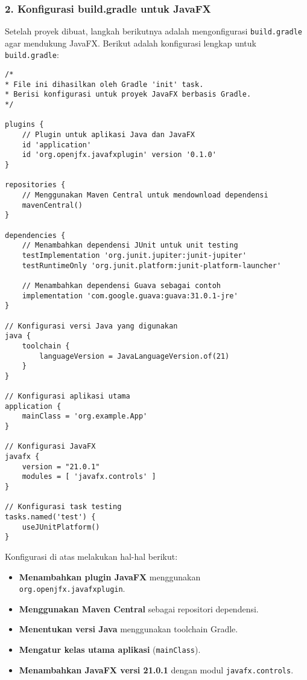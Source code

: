 \subsubsection{2. Konfigurasi build.gradle untuk JavaFX}

Setelah proyek dibuat, langkah berikutnya adalah mengonfigurasi \texttt{build.gradle} agar mendukung JavaFX. Berikut adalah konfigurasi lengkap untuk \texttt{build.gradle}:

\begin{lstlisting}[style=JavaStyle, caption=Konfigurasi build.gradle untuk JavaFX]
/*
* File ini dihasilkan oleh Gradle 'init' task.
* Berisi konfigurasi untuk proyek JavaFX berbasis Gradle.
*/

plugins {
	// Plugin untuk aplikasi Java dan JavaFX
	id 'application'
	id 'org.openjfx.javafxplugin' version '0.1.0'
}

repositories {
	// Menggunakan Maven Central untuk mendownload dependensi
	mavenCentral()
}

dependencies {
	// Menambahkan dependensi JUnit untuk unit testing
	testImplementation 'org.junit.jupiter:junit-jupiter'
	testRuntimeOnly 'org.junit.platform:junit-platform-launcher'
	
	// Menambahkan dependensi Guava sebagai contoh
	implementation 'com.google.guava:guava:31.0.1-jre'
}

// Konfigurasi versi Java yang digunakan
java {
	toolchain {
		languageVersion = JavaLanguageVersion.of(21)
	}
}

// Konfigurasi aplikasi utama
application {
	mainClass = 'org.example.App'
}

// Konfigurasi JavaFX
javafx {
	version = "21.0.1"
	modules = [ 'javafx.controls' ]
}

// Konfigurasi task testing
tasks.named('test') {
	useJUnitPlatform()
}
\end{lstlisting}

Konfigurasi di atas melakukan hal-hal berikut:
\begin{itemize}
\item \textbf{Menambahkan plugin JavaFX} menggunakan \texttt{org.openjfx.javafxplugin}.
\item \textbf{Menggunakan Maven Central} sebagai repositori dependensi.
\item \textbf{Menentukan versi Java} menggunakan toolchain Gradle.
\item \textbf{Mengatur kelas utama aplikasi} (\texttt{mainClass}).
\item \textbf{Menambahkan JavaFX versi 21.0.1} dengan modul \texttt{javafx.controls}.
\end{itemize}


